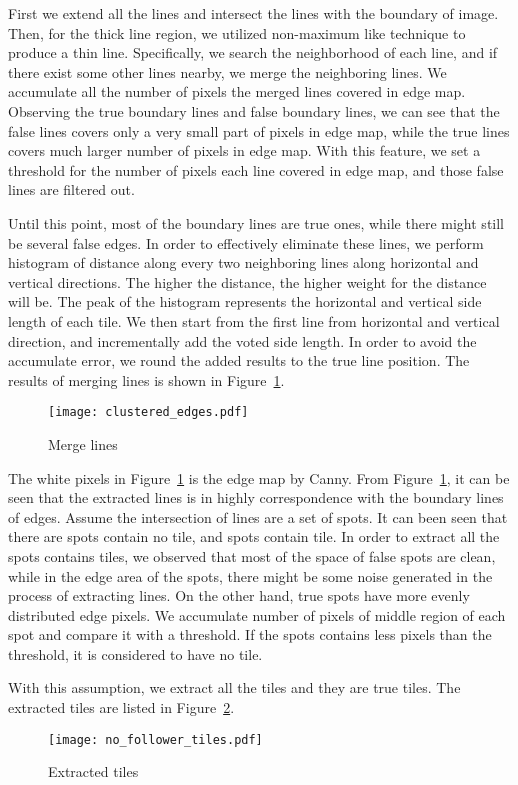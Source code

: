 \begin{enumerate}
			First we extend all the lines and intersect the lines with the boundary of image. Then, for 
			the thick line region, we utilized non-maximum like technique to produce a thin line. Specifically, 
			we search the neighborhood of each line, and if there exist some other lines nearby, we merge the 
			neighboring lines. We accumulate all the number of pixels the merged lines covered in edge map. 
			Observing the true boundary lines and false boundary lines, we can see that the false lines covers 
			only a very small part of pixels in edge map, while the true lines covers much larger number of pixels 
			in edge map. With this feature, we set a threshold for the number of pixels each line covered in edge 
			map, and those false lines are filtered out. 
			
			Until this point, most of the boundary lines are true ones, while there might still be several false 
			edges. In order to effectively eliminate these lines, we perform histogram of distance along every two 
			neighboring lines along horizontal and vertical directions. The higher the distance, the higher weight 
			for the distance will be. The peak of the histogram represents the horizontal and vertical side length 
			of each tile. We then start from the first line from horizontal and vertical direction, and 
			incrementally add the voted side length. In order to avoid the accumulate error, we round the added 
			results to the true line position. The results of merging lines is shown in Figure~\ref{Merge_line}. 
			
			\begin{figure}[htbp]
				  \centering
				  \texttt{[image: clustered\_edges.pdf]}
				  \caption{Merge lines}
				  \label{Merge_line}
			\end{figure}
\end{enumerate}
	The white pixels in Figure~\ref{Merge_line} is the edge map by Canny. From Figure~\ref{Merge_line}, it can be 
	seen that the extracted lines is in highly correspondence with the boundary 
	lines of edges. Assume the intersection of lines are a set of spots. It can been seen that there are spots contain
	no tile, and spots contain tile. In order to extract all the spots contains tiles, we observed that most of the 
	space of false spots are clean, while in the edge area of the spots, there might be some noise generated in the 
	process of extracting lines. On the other hand, true spots have more evenly distributed edge pixels. We accumulate 
	number of pixels of middle region of each spot and compare it with a threshold. If the spots contains less pixels 
	than the threshold, it is considered to have no tile.
	
	With this assumption, we extract all the tiles and they are true tiles. The extracted tiles are listed in 
	Figure~\ref{ex_tiles}.
	
	\begin{figure}[htbp]
		  \centering
		  \texttt{[image: no\_follower\_tiles.pdf]}
		  \caption{Extracted tiles}
		  \label{ex_tiles}
	\end{figure}
	
	

